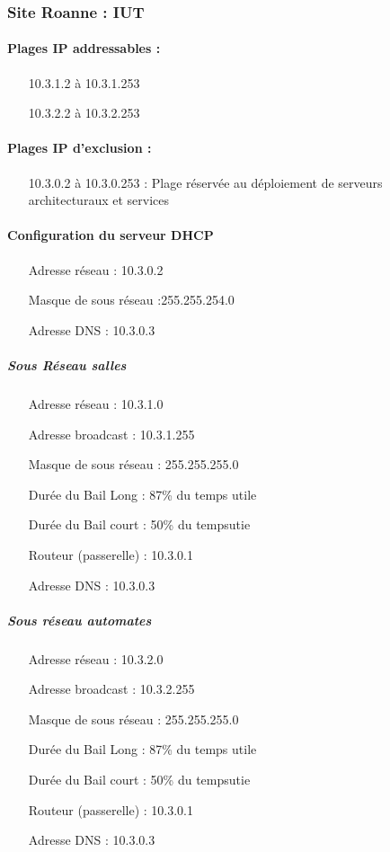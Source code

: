 \documentclass[a4paper]{article}
\begin{document}
\subsubsection{Site Roanne : IUT}

\paragraph{Plages IP addressables :} 
\begin{itemize}
\item[10.3.1.2 à 10.3.1.253]
\item[10.3.2.2 à 10.3.2.253]
\end{itemize}

\paragraph{Plages IP d'exclusion :}
\begin{itemize}
\item[10.3.0.2 à 10.3.0.253] : Plage réservée au déploiement de serveurs architecturaux et services
\end{itemize}

\paragraph{Configuration du serveur DHCP}

\begin{itemize}
\item[Adresse réseau]: 10.3.0.2
\item[Masque de sous réseau]:255.255.254.0
\item[Adresse DNS]: 10.3.0.3
\end{itemize}

\subparagraph{Sous Réseau salles}
\begin{itemize}
\item[Adresse réseau]: 10.3.1.0
\item[Adresse broadcast]: 10.3.1.255
\item[Masque de sous réseau]: 255.255.255.0
\item[Durée du Bail Long]: 87\% du temps utile
\item[Durée du Bail court]: 50\% du tempsutie
\item[Routeur (passerelle)]: 10.3.0.1
\item[Adresse DNS]: 10.3.0.3
\end{itemize}

\subparagraph{Sous réseau automates}
\begin{itemize}
\item[Adresse réseau]: 10.3.2.0
\item[Adresse broadcast]: 10.3.2.255
\item[Masque de sous réseau]: 255.255.255.0
\item[Durée du Bail Long]: 87\% du temps utile
\item[Durée du Bail court]: 50\% du tempsutie
\item[Routeur (passerelle)]: 10.3.0.1
\item[Adresse DNS]: 10.3.0.3
\end{itemize}
\end{document}
